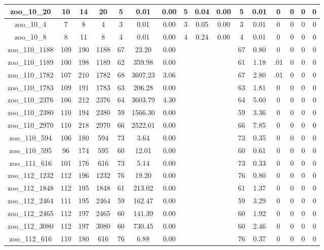 \begin{landscape}
\begin{longtable}{|c|c|c|c|c|c|c|c|c|c|c|c|c|c|c|c|}
zoo\_10\_20 & 10 & 14 & 20 & 5 & 0.01 & 0.00 & 5 & 0.04 & 0.00 & 5 & 0.01 & 0 & 0 & 0 & 0 \\ \hline 
zoo\_10\_4 & 7 & 8 & 4 & 3 & 0.01 & 0.00 & 3 & 0.05 & 0.00 & 3 & 0.01 & 0 & 0 & 0 & 0 \\ \hline 
zoo\_10\_8 & 8 & 11 & 8 & 4 & 0.01 & 0.00 & 4 & 0.24 & 0.00 & 4 & 0.01 & 0 & 0 & 0 & 0 \\ \hline 
zoo\_110\_1188 & 109 & 190 & 1188 & 67 & 23.20 & 0.00 &  &  &  & 67 & 0.80 & 0 & 0 & 0 & 0 \\ \hline 
zoo\_110\_1189 & 100 & 198 & 1189 & 62 & 359.98 & 0.00 &  &  &  & 61 & 1.18 & .01 & 0 & 0 & 0 \\ \hline 
zoo\_110\_1782 & 107 & 210 & 1782 & 68 & 3607.23 & 3.06 &  &  &  & 67 & 2.80 & .01 & 0 & 0 & 0 \\ \hline 
zoo\_110\_1783 & 109 & 191 & 1783 & 63 & 206.28 & 0.00 &  &  &  & 63 & 1.81 & 0 & 0 & 0 & 0 \\ \hline 
zoo\_110\_2376 & 106 & 212 & 2376 & 64 & 3603.79 & 4.30 &  &  &  & 64 & 5.60 & 0 & 0 & 0 & 0 \\ \hline 
zoo\_110\_2380 & 110 & 194 & 2380 & 59 & 1566.30 & 0.00 &  &  &  & 59 & 3.36 & 0 & 0 & 0 & 0 \\ \hline 
zoo\_110\_2970 & 110 & 218 & 2970 & 66 & 2522.01 & 0.00 &  &  &  & 66 & 7.85 & 0 & 0 & 0 & 0 \\ \hline 
zoo\_110\_594 & 106 & 180 & 594 & 73 & 3.64 & 0.00 &  &  &  & 73 & 0.35 & 0 & 0 & 0 & 0 \\ \hline 
zoo\_110\_595 & 96 & 174 & 595 & 60 & 12.01 & 0.00 &  &  &  & 60 & 0.61 & 0 & 0 & 0 & 0 \\ \hline 
zoo\_111\_616 & 101 & 176 & 616 & 73 & 5.14 & 0.00 &  &  &  & 73 & 0.33 & 0 & 0 & 0 & 0 \\ \hline 
zoo\_112\_1232 & 112 & 196 & 1232 & 76 & 19.20 & 0.00 &  &  &  & 76 & 0.80 & 0 & 0 & 0 & 0 \\ \hline 
zoo\_112\_1848 & 112 & 195 & 1848 & 61 & 213.02 & 0.00 &  &  &  & 61 & 1.37 & 0 & 0 & 0 & 0 \\ \hline 
zoo\_112\_2464 & 111 & 195 & 2464 & 59 & 162.47 & 0.00 &  &  &  & 59 & 3.29 & 0 & 0 & 0 & 0 \\ \hline 
zoo\_112\_2465 & 112 & 197 & 2465 & 60 & 141.39 & 0.00 &  &  &  & 60 & 1.92 & 0 & 0 & 0 & 0 \\ \hline 
zoo\_112\_3080 & 112 & 197 & 3080 & 60 & 730.45 & 0.00 &  &  &  & 60 & 2.46 & 0 & 0 & 0 & 0 \\ \hline 
zoo\_112\_616 & 110 & 180 & 616 & 76 & 6.88 & 0.00 &  &  &  & 76 & 0.37 & 0 & 0 & 0 & 0 \\ \hline 

\end{longtable}
\end{landscape}
